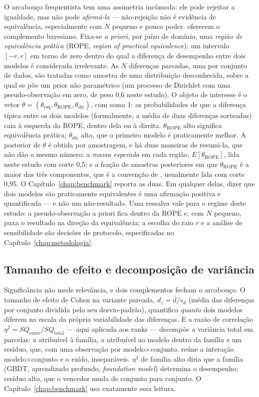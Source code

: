 O arcabouço frequentista tem uma assimetria incômoda: ele pode
rejeitar a igualdade, mas não pode \emph{afirmá-la} --- não-rejeição não é
evidência de equivalência, especialmente com $N$ pequeno e pouco poder.
\citet{benavoli2017} oferecem o complemento bayesiano. Fixa-se
\emph{a priori}, por juízo de domínio, uma \emph{região de
equivalência prática} (ROPE, \emph{region of practical equivalence}):
um intervalo $[-r, r]$ em torno de zero dentro do qual a diferença de
desempenho entre dois modelos é considerada irrelevante. As $N$
diferenças pareadas, uma por conjunto de dados, são tratadas como
amostra de uma distribuição desconhecida, sobre a qual se põe um prior
não paramétrico (um processo de Dirichlet com uma pseudo-observação em
zero, de peso 0,6 neste estudo). O objeto de interesse é o vetor
$\theta = (\theta_{\text{esq}}, \theta_{\text{ROPE}},
\theta_{\text{dir}})$, com soma 1: as probabilidades de que a
diferença típica entre os dois modelos (formalmente, a média de duas
diferenças sorteadas) caia à esquerda da ROPE, dentro dela ou à
direita. $\theta_{\text{ROPE}}$ alto significa equivalência prática;
$\theta_{\text{dir}}$ alto, que o primeiro modelo é praticamente
melhor. A posterior de $\theta$ é obtida por amostragem, e há duas
maneiras de resumi-la, que não dão o mesmo número: a \emph{massa
esperada} em cada região, $E[\theta_{\text{ROPE}}]$, lida neste
estudo com corte 0,5; e a fração de amostras posteriores em que
$\theta_{\text{ROPE}}$ é a maior das três componentes, que é a
convenção de \citet{benavoli2017}, usualmente lida com corte 0,95. O
Capítulo~\ref{chap:benchmark} reporta as duas. Em qualquer delas,
dizer que dois modelos são praticamente equivalentes é uma afirmação
positiva e quantificada --- e não um não-resultado. Uma ressalva vale
para o regime deste estudo: a pseudo-observação a priori fica dentro
da ROPE e, com $N$ pequeno, puxa o resultado na direção da
equivalência; a escolha do raio $r$ e a análise de sensibilidade são
decisões de protocolo, especificadas no
Capítulo~\ref{chap:metodologia}.

\subsection{Tamanho de efeito e decomposição de variância}

Significância
não mede relevância, e dois complementos fecham o arcabouço. O tamanho de
efeito de Cohen na variante pareada,
$d_z = \bar{d} / s_d$ (média das diferenças por conjunto dividida pelo seu
desvio-padrão), quantifica \emph{quanto} dois modelos diferem na escala da
própria variabilidade das diferenças. E a razão de correlação
$\eta^2 = \mathit{SQ}_{\text{entre}} / \mathit{SQ}_{\text{total}}$ ---
aqui aplicada aos ranks --- decompõe a variância total em parcelas: a
atribuível à família, a atribuível ao modelo dentro da família e um
resíduo, que, com uma observação por modelo$\times$conjunto, reúne a
interação modelo$\times$conjunto e o ruído, inseparáveis. $\eta^2$
de família alto diria que a família (GBDT, aprendizado profundo,
\emph{foundation model}) determina o desempenho; resíduo alto, que o
vencedor muda de conjunto para conjunto. O
Capítulo~\ref{chap:benchmark} usa exatamente essa leitura.
